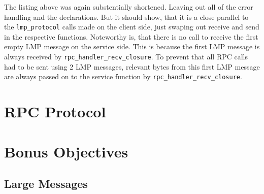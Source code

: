 The listing above was again substentially shortened. Leaving out all of the error handling and the declarations. But it should show, that it is a close parallel to the \verb|lmp_protocol| calls made on the client side, just swaping out receive and send in the respective functions.
Noteworthy is, that there is no call to receive the first empty LMP message on the service side. This is because the first LMP message is always received by \verb|rpc_handler_recv_closure|. To prevent that all RPC calls had to be sent using 2 LMP messages, relevant bytes from this first LMP message are always passed on to the service function by \verb|rpc_handler_recv_closure|.


\section{RPC Protocol}

\section{Bonus Objectives}

\subsection{Large Messages}
